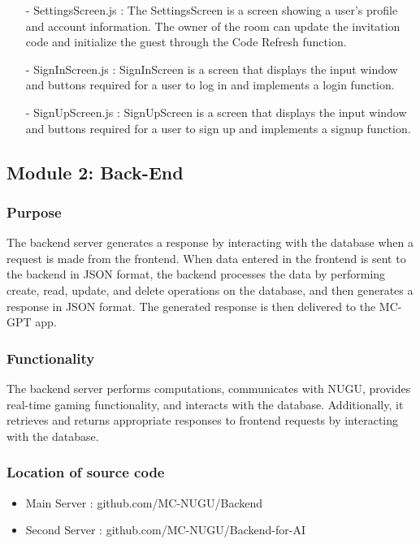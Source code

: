 \documentclass[conference]{IEEEtran}
\begin{document}
\begin{itemize}
                    \item[-] SettingsScreen.js : The SettingsScreen is a screen showing a user's profile and account information. The owner of the room can update the invitation code and initialize the guest through the Code Refresh function.
                    \item[-] SignInScreen.js : SignInScreen is a screen that displays the input window and buttons required for a user to log in and implements a login function.
                    \item[-] SignUpScreen.js : SignUpScreen is a screen that displays the input window and buttons required for a user to sign up and implements a signup function.
            \end{itemize}    
        
    \subsection{Module 2: Back-End}
        \subsubsection{Purpose} 
            The backend server generates a response by interacting with the database when a request is made from the frontend. When data entered in the frontend is sent to the backend in JSON format, the backend processes the data by performing create, read, update, and delete operations on the database, and then generates a response in JSON format. The generated response is then delivered to the MC-GPT app.\\
            \vspace{3mm}
        \subsubsection{Functionality}
            The backend server performs computations, communicates with NUGU, provides real-time gaming functionality, and interacts with the database. Additionally, it retrieves and returns appropriate responses to frontend requests by interacting with the database.\\
            \vspace{3mm}
        \subsubsection{Location of source code}
            \begin{itemize}
                \item Main Server : github.com/MC-NUGU/Backend
                \item Second Server : github.com/MC-NUGU/Backend-for-AI
            \end{itemize}
\end{document}
